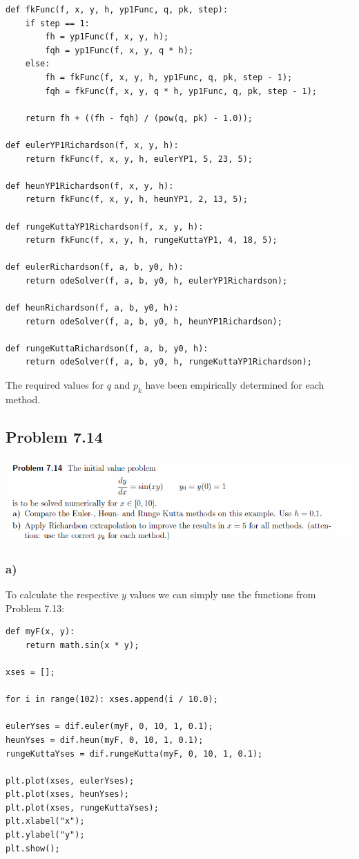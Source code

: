 \begin{lstlisting}[caption=Problem 7.13 b)]
def fkFunc(f, x, y, h, yp1Func, q, pk, step):
	if step == 1:
		fh = yp1Func(f, x, y, h);
		fqh = yp1Func(f, x, y, q * h);
	else:
		fh = fkFunc(f, x, y, h, yp1Func, q, pk, step - 1);
		fqh = fkFunc(f, x, y, q * h, yp1Func, q, pk, step - 1);
	
	return fh + ((fh - fqh) / (pow(q, pk) - 1.0));

def eulerYP1Richardson(f, x, y, h):
	return fkFunc(f, x, y, h, eulerYP1, 5, 23, 5);

def heunYP1Richardson(f, x, y, h):
	return fkFunc(f, x, y, h, heunYP1, 2, 13, 5);

def rungeKuttaYP1Richardson(f, x, y, h):
	return fkFunc(f, x, y, h, rungeKuttaYP1, 4, 18, 5);

def eulerRichardson(f, a, b, y0, h):
	return odeSolver(f, a, b, y0, h, eulerYP1Richardson);

def heunRichardson(f, a, b, y0, h):
	return odeSolver(f, a, b, y0, h, heunYP1Richardson);

def rungeKuttaRichardson(f, a, b, y0, h):
	return odeSolver(f, a, b, y0, h, rungeKuttaYP1Richardson);
\end{lstlisting}

The required values for $q$ and $p_{k}$ have been empirically determined for each method.


\subsection{Problem 7.14}

\includegraphics[width=1\textwidth]{chapters/images/desc-7-14}


\subsubsection{a)}

To calculate the respective $y$ values we can simply use the functions from Problem 7.13:

\begin{lstlisting}[caption=Problem 7.14 a)]
def myF(x, y):
	return math.sin(x * y);

xses = [];

for i in range(102): xses.append(i / 10.0);

eulerYses = dif.euler(myF, 0, 10, 1, 0.1);
heunYses = dif.heun(myF, 0, 10, 1, 0.1);
rungeKuttaYses = dif.rungeKutta(myF, 0, 10, 1, 0.1);

plt.plot(xses, eulerYses);
plt.plot(xses, heunYses);
plt.plot(xses, rungeKuttaYses);
plt.xlabel("x");
plt.ylabel("y");
plt.show();
\end{lstlisting}

